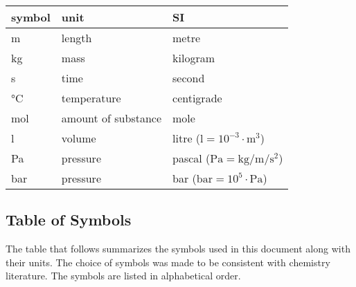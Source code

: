 \documentclass[12pt]{article}
\begin{document}
\renewcommand{\arraystretch}{1.2}
  \noindent \begin{tabular}{l l l} 
    \toprule		
    \textbf{symbol} & \textbf{unit} & \textbf{SI}\\
    \midrule 
    \si{\metre} & length & metre\\
    \si{\kilogram} & mass & kilogram\\
    \si{\second} & time & second\\
    \si{\celsius} & temperature & centigrade\\
    \si{\mole} & amount of substance & mole\\
    \si{\litre} & volume & litre ($\si{\litre} = 10^{-3}\cdot\si{\cubic\metre}$)\\
    \si{\pascal} & pressure & pascal ($\si{\pascal} = \si{\kilogram\per\metre\per\square\second}$)\\
    \si{\bar} & pressure & bar ($\si{\bar} = 10^{5}\cdot\si{\pascal}$)\\
    \bottomrule
  \end{tabular}

\subsection{Table of Symbols}

The table that follows summarizes the symbols used in this document along with
their units.  The choice of symbols was made to be consistent with chemistry literature.  The symbols are listed in alphabetical order.
\end{document}
